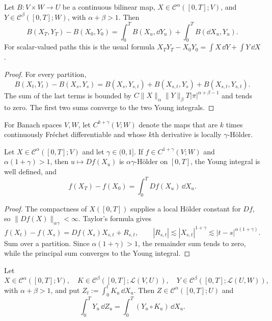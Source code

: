 \begin{lem}
Let $B\colon V\times W\to U$ be a continuous bilinear map,
$X\in\mathcal C^\alpha([0,T];V)$, and
$Y\in\mathcal C^\beta([0,T];W)$, with $\alpha+\beta>1$.  Then
\[
  B(X_T,Y_T)-B(X_0,Y_0)
  =\int_0^T B(X_u,\dd Y_u)+\int_0^T B(\dd X_u,Y_u).
\]
For scalar-valued paths this is the usual formula
$X_TY_T-X_0Y_0=\int X\,\dd Y+\int Y\,\dd X$.
\end{lem}

\begin{proof}
For every partition,
\[
  B(X_t,Y_t)-B(X_s,Y_s)
  =B(X_s,Y_{s,t})+B(X_{s,t},Y_s)+B(X_{s,t},Y_{s,t}).
\]
The sum of the last terms is bounded by
$C\|X\|_\alpha\|Y\|_\beta T|\pi|^{\alpha+\beta-1}$ and tends to zero.
The first two sums converge to the two Young integrals.
\end{proof}

For Banach spaces $V,W$, let $C^{k+\gamma}(V;W)$ denote the maps that are
$k$ times continuously Fréchet differentiable and whose $k$th derivative is
locally $\gamma$-Hölder.

\begin{lem}
Let $X\in\mathcal C^\alpha([0,T];V)$ and let $\gamma\in(0,1]$.  If
$f\in C^{1+\gamma}(V;W)$ and $\alpha(1+\gamma)>1$, then
$u\mapsto Df(X_u)$ is $\alpha\gamma$-Hölder on $[0,T]$, the Young integral is
well defined, and
\[
  f(X_T)-f(X_0)=\int_0^T Df(X_u)\,\dd X_u.
\]
\end{lem}

\begin{proof}
The compactness of $X([0,T])$ supplies a local Hölder constant for $Df$, so
$\|Df(X)\|_{\alpha\gamma}<\infty$.  Taylor's formula gives
\[
  f(X_t)-f(X_s)=Df(X_s)X_{s,t}+R_{s,t},
  \qquad |R_{s,t}|\lesssim |X_{s,t}|^{1+\gamma}
  \lesssim |t-s|^{\alpha(1+\gamma)}.
\]
Sum over a partition.  Since $\alpha(1+\gamma)>1$, the remainder sum tends to
zero, while the principal sum converges to the Young integral.
\end{proof}

\begin{lem}
Let
\[
  X\in\mathcal C^\alpha([0,T];V),\quad
  K\in\mathcal C^\beta([0,T];\mathcal L(V,U)),\quad
  Y\in\mathcal C^\beta([0,T];\mathcal L(U,W)),
\]
with $\alpha+\beta>1$, and put
$Z_t:=\int_0^tK_u\,\dd X_u$.  Then $Z\in\mathcal C^\alpha([0,T];U)$ and
\[
  \int_0^T Y_u\,\dd Z_u
  =\int_0^T (Y_u\circ K_u)\,\dd X_u.
\]
\end{lem}

